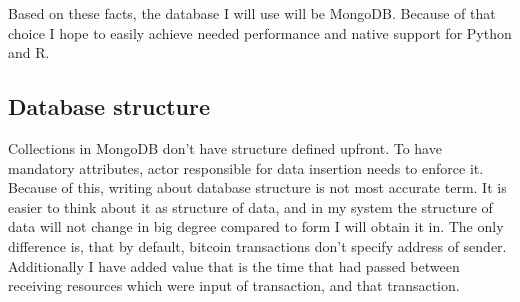 \documentclass[12pt, en, eng, oneside]{mgr}
\begin{document}
Based on these facts, the database I will use will be MongoDB. Because of that choice I hope to easily achieve needed performance and native support for Python and R.


\subsection{Database structure}
 
Collections in MongoDB don't have structure defined upfront. To have mandatory attributes, actor responsible for data insertion needs to enforce it. Because of this, writing about database structure is not most accurate term. It is easier to think about it as structure of data, and in my system the structure of data will not change in big degree compared to form I will obtain it in. The only difference is, that by default, bitcoin transactions don't specify address of sender. Additionally I have added value that is the time that had passed between receiving resources which were input of transaction, and that transaction.
\end{document}
